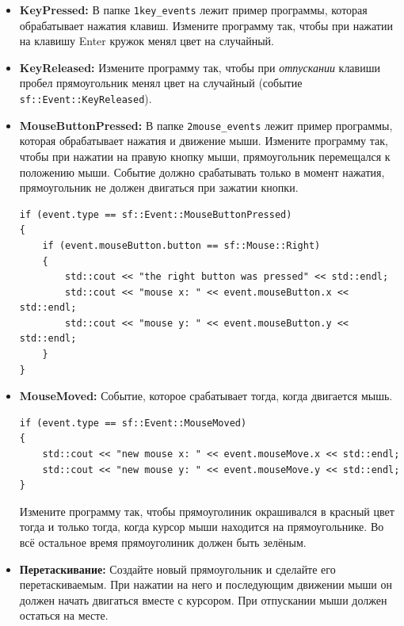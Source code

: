 \documentclass{article}
\begin{document}
\begin{itemize}
\item \textbf{KeyPressed:} В папке \texttt{1key\_events} лежит пример программы, которая обрабатывает нажатия клавиш. Измените программу так, чтобы при нажатии на клавишу Enter кружок менял цвет на случайный.

\item \textbf{KeyReleased:} Измените программу так, чтобы при \textit{отпускании} клавиши пробел прямоугольник менял цвет на случайный (событие \texttt{sf::Event::KeyReleased}).

\item \textbf{MouseButtonPressed:} В папке \texttt{2mouse\_events} лежит пример программы, которая обрабатывает нажатия и движение мыши. Измените программу так, чтобы при нажатии на правую кнопку мыши, прямоугольник перемещался к положению мыши. Событие должно срабатывать только в момент нажатия, прямоугольник не должен двигаться при зажатии кнопки.
\begin{lstlisting}
if (event.type == sf::Event::MouseButtonPressed)
{
    if (event.mouseButton.button == sf::Mouse::Right)
    {
        std::cout << "the right button was pressed" << std::endl;
        std::cout << "mouse x: " << event.mouseButton.x << std::endl;
        std::cout << "mouse y: " << event.mouseButton.y << std::endl;
    }
}
\end{lstlisting}


\item \textbf{MouseMoved:} Событие, которое срабатывает тогда, когда двигается мышь.
\begin{lstlisting}
if (event.type == sf::Event::MouseMoved)
{
    std::cout << "new mouse x: " << event.mouseMove.x << std::endl;
    std::cout << "new mouse y: " << event.mouseMove.y << std::endl;
}
\end{lstlisting}
Измените программу так, чтобы прямоуголиник окрашивался в красный цвет тогда и только тогда, когда курсор мыши находится на прямоугольнике. Во всё остальное время прямоуголиник должен быть зелёным.

\item \textbf{Перетаскивание:} Создайте новый прямоугольник и сделайте его перетаскиваемым. При нажатии на него и последующим движении мыши он должен начать двигаться вместе с курсором. При отпускании мыши должен остаться на месте.



\end{itemize}

\newpage
\end{document}
